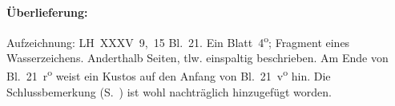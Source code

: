 %
%
%
\begin{ledgroupsized}[r]{120mm}
\footnotesize
\pstart
\noindent
\textbf{Überlieferung:}
\pend
\end{ledgroupsized}
\begin{ledgroupsized}[r]{114mm}
\footnotesize
\pstart \parindent -6mm
%
Aufzeichnung: LH~XXXV~9,~15 Bl.~21.
Ein Blatt~4\textsuperscript{o};
Fragment eines Wasserzeichens.
Anderthalb Seiten, tlw. einspaltig beschrieben.
Am Ende von Bl.~21~r\textsuperscript{o} weist ein Kustos auf den Anfang von Bl.~21~v\textsuperscript{o} hin.
Die Schlussbemerkung
(S.~)
ist wohl %
nachträglich hinzugefügt worden.
\pend
\end{ledgroupsized}
%
%
\vspace{5mm}
